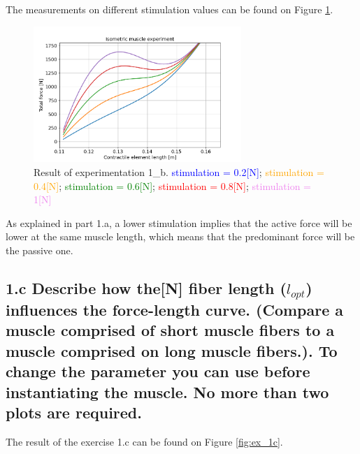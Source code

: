 \documentclass{cmc}
\begin{document}
The measurements on different stimulation values can be found on Figure \ref{fig:ex_1b}.

    \begin{figure}[H]
      \centering \includegraphics[width=0.7\textwidth]{figures/1b stim.png}
      \caption{\label{fig:ex_1b} Result of experimentation 1\_b. \textcolor{blue}{stimulation = 0.2[N]}; \textcolor{orange}{stimulation = 0.4[N]}; \textcolor{green}{stimulation = 0.6[N]}; \textcolor{red}{stimulation = 0.8[N]}; \textcolor{violet}{stimulation = 1[N]}}
    \end{figure}
    
    As explained in part 1.a, a lower stimulation implies that the active force will be lower at the same muscle length, which means that the predominant force will be the passive one.

\subsection*{1.c Describe how the[N] fiber length ($l_{opt}$) influences
  the force-length curve.  (Compare a muscle comprised of short muscle
  fibers to a muscle comprised on long muscle fibers.). To change the
  parameter you can use
   before
  instantiating the muscle. No more than two plots are required. }

    
    The result of the exercise 1.c can be found on Figure \ref{fig:ex_1c}.
    
\end{document}
